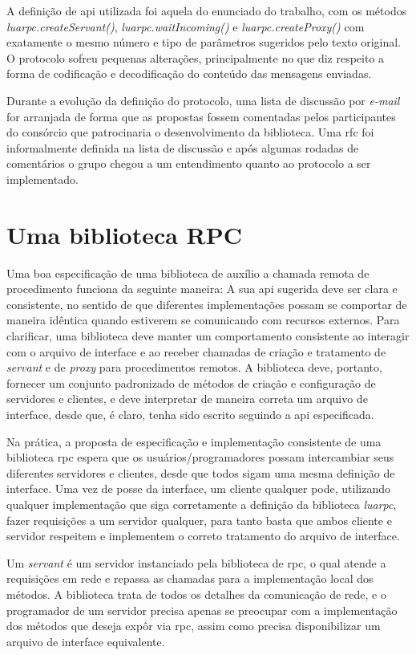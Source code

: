 \documentclass[11pt]{article}
\begin{document}
A definição de \gls{api} utilizada foi aquela do enunciado do trabalho, com os
métodos \textit{luarpc.createServant()}, \textit{luarpc.waitIncoming()} e
\textit{luarpc.createProxy()} com exatamente o mesmo número e tipo de parâmetros
sugeridos pelo texto original. O protocolo sofreu pequenas alterações,
principalmente no que diz respeito a forma de codificação e decodificação do
conteúdo das mensagens enviadas.

Durante a evolução da definição do protocolo, uma lista de discussão por
\textit{e-mail} for arranjada de forma que as propostas fossem comentadas pelos
participantes do consórcio que patrocinaria o desenvolvimento da biblioteca.
Uma \gls{rfc} foi informalmente definida na lista de discussão e após algumas
rodadas de comentários o grupo chegou a um entendimento quanto ao protocolo a
ser implementado.

\section{Uma biblioteca RPC}\label{sec:rpc}

Uma boa especificação de uma biblioteca de auxílio a chamada remota de
procedimento funciona da seguinte maneira: A sua \gls{api} sugerida deve ser
clara e consistente, no sentido de que diferentes implementações possam se
comportar de maneira idêntica quando estiverem se comunicando com recursos
externos. Para clarificar, uma biblioteca deve manter um comportamento
consistente ao interagir com o arquivo de interface e ao receber chamadas de
criação e tratamento de \textit{servant} e de \textit{proxy} para procedimentos
remotos. A biblioteca deve, portanto, fornecer um conjunto padronizado de
métodos de criação e configuração de servidores e clientes, e deve interpretar
de maneira correta um arquivo de interface, desde que, é claro, tenha sido
escrito seguindo a \gls{api} especificada.

Na prática, a proposta de especificação e implementação consistente de uma
biblioteca \gls{rpc} espera que os usuários/programadores possam intercambiar
seus diferentes servidores e clientes, desde que todos sigam uma mesma definição
de interface. Uma vez de posse da interface, um cliente qualquer pode,
utilizando qualquer implementação que siga corretamente a definição da
biblioteca \textit{luarpc}, fazer requisições a um servidor qualquer, para tanto
basta que ambos cliente e servidor respeitem e implementem o correto tratamento
do arquivo de interface.

Um \textit{servant} é um servidor instanciado pela biblioteca de \gls{rpc}, o
qual atende a requisições em rede e repassa as chamadas para a implementação
local dos métodos. A biblioteca trata de todos os detalhes da comunicação de
rede, e o programador de um servidor precisa apenas se preocupar com a
implementação dos métodos que deseja expôr via \gls{rpc}, assim como precisa
disponibilizar um arquivo de interface equivalente.
\end{document}
